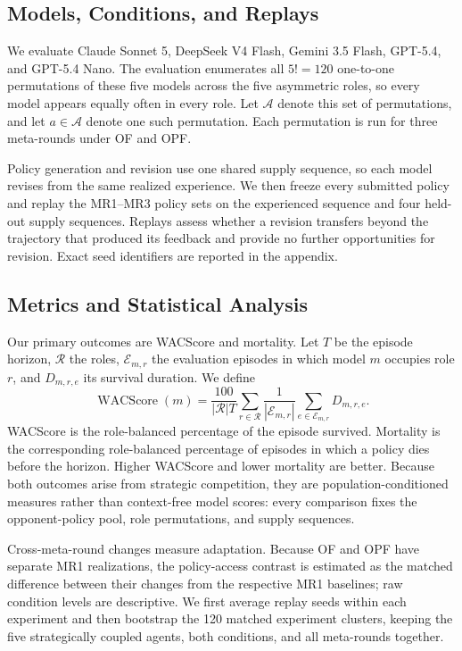 \documentclass[letterpaper]{article} %
\begin{document}
\subsection{Models, Conditions, and Replays}

We evaluate Claude Sonnet 5, DeepSeek V4 Flash, Gemini 3.5 Flash,
GPT-5.4, and GPT-5.4 Nano. The evaluation enumerates all $5!=120$
one-to-one permutations of these five models across the five asymmetric
roles, so every model appears equally often in every role. Let
$\mathcal{A}$ denote this set of permutations, and let
$a\in\mathcal{A}$ denote one such permutation. Each permutation is run for
three meta-rounds under OF and OPF.

Policy generation and revision use one shared supply sequence, so each model
revises from the same realized experience. We then freeze every submitted
policy and replay the MR1--MR3 policy sets on the experienced sequence and
four held-out supply sequences. Replays assess whether a revision transfers
beyond the trajectory that produced its feedback and provide no further
opportunities for revision. Exact seed identifiers are reported in the
appendix.

\subsection{Metrics and Statistical Analysis}

Our primary outcomes are WACScore and mortality. Let $T$ be the episode
horizon, $\mathcal{R}$ the roles, $\mathcal{E}_{m,r}$ the evaluation episodes
in which model $m$ occupies role $r$, and $D_{m,r,e}$ its survival duration.
We define
\begin{equation}
    \operatorname{WACScore}(m)
    =
    \frac{100}{|\mathcal{R}|T}
    \sum_{r\in\mathcal{R}}
    \frac{1}{|\mathcal{E}_{m,r}|}
    \sum_{e\in\mathcal{E}_{m,r}}D_{m,r,e}.
\end{equation}
WACScore is the role-balanced percentage of the episode survived. Mortality
is the corresponding role-balanced percentage of episodes in which a policy
dies before the horizon. Higher WACScore and lower mortality are better.
Because both outcomes arise from strategic competition, they are
population-conditioned measures rather than context-free model scores: every
comparison fixes the opponent-policy pool, role permutations, and supply
sequences.

Cross-meta-round changes measure adaptation. Because OF and OPF have separate
MR1 realizations, the policy-access contrast is estimated as the matched
difference between their changes from the respective MR1 baselines; raw
condition levels are descriptive. We first average replay seeds within each
experiment and then bootstrap the 120 matched experiment clusters, keeping
the five strategically coupled agents, both conditions, and all meta-rounds
together.
\end{document}
